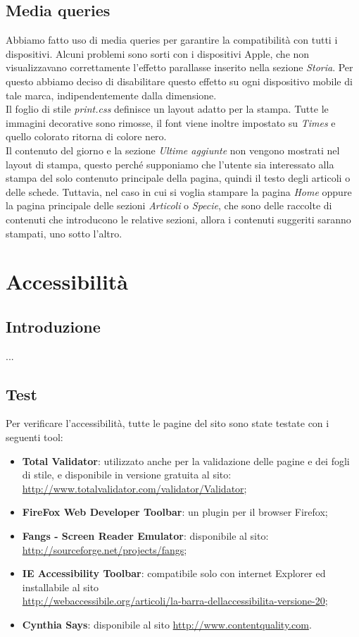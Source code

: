 \documentclass[12pt]{article}
\begin{document}
	\subsection{Media queries}
	Abbiamo fatto uso di media queries per garantire la compatibilità con tutti i dispositivi. Alcuni problemi sono sorti con i dispositivi Apple, che non visualizzavano correttamente l'effetto parallasse inserito nella sezione \textit{Storia}. Per questo abbiamo deciso di disabilitare questo effetto su ogni dispositivo mobile di tale marca, indipendentemente dalla dimensione.\\
	Il foglio di stile \textit{print.css} definisce un layout adatto per la stampa. Tutte le immagini decorative sono rimosse, il font viene inoltre impostato su \textit{Times} e quello colorato ritorna di colore nero.\\
	Il contenuto del giorno e la sezione \textit{Ultime aggiunte} non vengono mostrati nel layout di stampa, questo perché supponiamo che l'utente sia interessato alla stampa del solo contenuto principale della pagina, quindi il testo degli articoli o delle schede. Tuttavia, nel caso in cui si voglia stampare la pagina \textit{Home} oppure la pagina principale delle sezioni \textit{Articoli} o \textit{Specie}, che sono delle raccolte di contenuti che introducono le relative sezioni, allora i contenuti suggeriti saranno stampati, uno sotto l'altro.
	
		
	\section{Accessibilità}
	\subsection{Introduzione}
	...
	\subsection{Test}
	Per verificare l'accessibilità, tutte le pagine del sito sono state testate con i seguenti tool:
	\begin{itemize}
		\item \textbf{Total Validator}: utilizzato anche per la validazione delle pagine e dei fogli di stile, e disponibile in versione gratuita al sito: 
		\url{http://www.totalvalidator.com/validator/Validator};
		\item \textbf{FireFox Web Developer Toolbar}: un plugin per il browser Firefox;
		\item \textbf{Fangs - Screen Reader Emulator}: disponibile al sito: \url{http://sourceforge.net/projects/fangs};
		\item \textbf{IE Accessibility Toolbar}: compatibile solo con internet Explorer ed installabile al sito\\ \url{http://webaccessibile.org/articoli/la-barra-dellaccessibilita-versione-20};
		\item \textbf{Cynthia Says}: disponibile al sito \url{http://www.contentquality.com}.
	\end{itemize}
\end{document}
